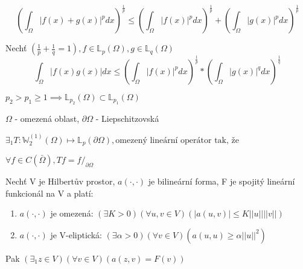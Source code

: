 \documentclass[../main.tex]{subfiles}
\begin{document}
\begin{theorem}
\begin{equation}\label{eq:Mink}
    \left ( \int_\Omega |f(x) + g(x)|^p dx \right ) ^{\frac{1}{p}} \leq \left ( \int_\Omega |f(x)|^p dx \right ) ^{\frac{1}{p}} + \left ( \int_\Omega |g(x)|^p dx \right ) ^{\frac{1}{p}}
\end{equation}
\end{theorem}


\begin{theorem}
Nechť $\left (  \frac{1}{p} + \frac{1}{q} = 1 \right ), f \in \mathbb{L}_p(\Omega), g \in \mathbb{L}_q(\Omega)$
\begin{equation}\label{eq:Holder}
    \int_\Omega \left| f(x)g(x) \right| dx \leq \left ( \int_\Omega |f(x)|^p dx \right ) ^{\frac{1}{p}} * \left ( \int_\Omega |g(x)|^q dx \right ) ^{\frac{1}{q}}
\end{equation}
\end{theorem}



\begin{theorem}



$p_2 > p_1 \geq 1 \implies \mathbb{L}_{p_2}(\Omega) \subset \mathbb{L}_{p_1}(\Omega)$
\end{theorem}




\begin{theorem}
    $\Omega$ - omezená oblast, $\partial \Omega$ - Liepschitzovská
    
    $\exists_1 T: \mathbb{W}_2^{(1)}(\Omega) \mapsto \mathbb{L}_p (\partial \Omega), \text{omezený lineární operátor tak, že}$
    
    $ \forall f\in C (\bar \Omega), Tf = f /_{\partial \Omega} $
\end{theorem}




\begin{theorem}
    Nechť V je Hilbertův prostor, $a(\cdot, \cdot)$ je bilineární forma, F je spojitý lineární funkcionál na V a platí:
    \begin{enumerate}
        \item $a(\cdot, \cdot)$ je omezená: $(\exists K>0)(\forall u,v \in V)(|a(u,v)|\leq K ||u|| ||v||)$
        \item $a(\cdot, \cdot)$ je V-eliptická: $(\exists\alpha>0)(\forall v \in V)(a(u,u)\geq \alpha||u||^2)$
    \end{enumerate}
    Pak $(\exists_1z\in V)(\forall v \in V)(a(z,v) = F(v))$
\end{theorem}
\end{document}
